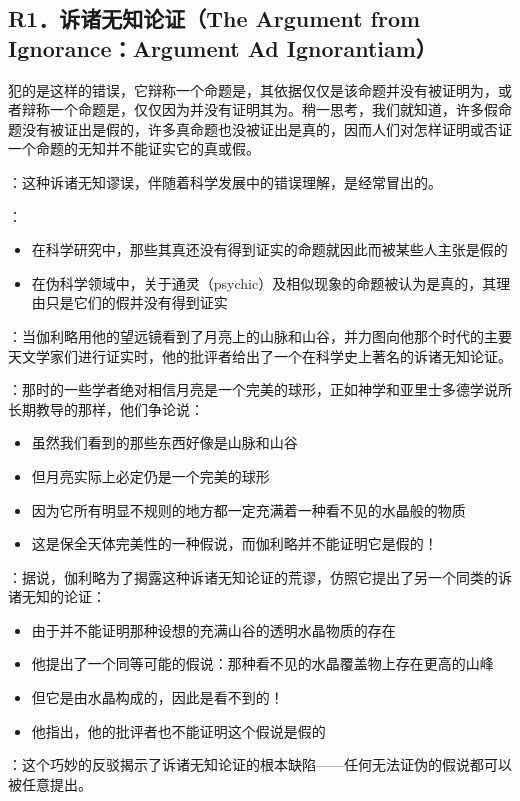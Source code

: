 \subsection{R1．诉诸无知论证（The Argument from Ignorance：Argument Ad Ignorantiam）}

\begin{theorembox}[title=诉诸无知论证的定义]
犯的是这样的错误，它辩称一个命题是，其依据仅仅是该命题并没有被证明为，或者辩称一个命题是，仅仅因为并没有证明其为。稍一思考，我们就知道，许多假命题没有被证出是假的，许多真命题也没被证出是真的，因而人们对怎样证明或否证一个命题的无知并不能证实它的真或假。
\end{theorembox}

\begin{theorembox}[title=诉诸无知谬误的常见表现]
：这种诉诸无知谬误，伴随着科学发展中的错误理解，是经常冒出的。

：
\begin{itemize}
  \item 在科学研究中，那些其真还没有得到证实的命题就因此而被某些人主张是假的
  \item 在伪科学领域中，关于通灵（psychic）及相似现象的命题被认为是真的，其理由只是它们的假并没有得到证实
\end{itemize}
\end{theorembox}

\begin{examplebox}[title=历史案例：伽利略的望远镜]
：当伽利略用他的望远镜看到了月亮上的山脉和山谷，并力图向他那个时代的主要天文学家们进行证实时，他的批评者给出了一个在科学史上著名的诉诸无知论证。

：那时的一些学者绝对相信月亮是一个完美的球形，正如神学和亚里士多德学说所长期教导的那样，他们争论说：
\begin{itemize}
  \item 虽然我们看到的那些东西好像是山脉和山谷
  \item 但月亮实际上必定仍是一个完美的球形
  \item 因为它所有明显不规则的地方都一定充满着一种看不见的水晶般的物质
  \item 这是保全天体完美性的一种假说，而伽利略并不能证明它是假的！
\end{itemize}

：据说，伽利略为了揭露这种诉诸无知论证的荒谬，仿照它提出了另一个同类的诉诸无知的论证：
\begin{itemize}
  \item 由于并不能证明那种设想的充满山谷的透明水晶物质的存在
  \item 他提出了一个同等可能的假说：那种看不见的水晶覆盖物上存在更高的山峰
  \item 但它是由水晶构成的，因此是看不到的！
  \item 他指出，他的批评者也不能证明这个假说是假的
\end{itemize}

：这个巧妙的反驳揭示了诉诸无知论证的根本缺陷——任何无法证伪的假说都可以被任意提出。
\end{examplebox}

